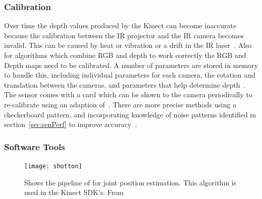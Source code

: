 \documentclass[11pt]{article} %
\begin{document}
\subsubsection{Calibration}


Over time the depth values produced by the Kinect can become inaccurate because the calibration between the IR projector and the IR camera becomes invalid. This can be caused by heat or vibration or a drift in the IR laser~\cite{Zhang2012a}. Also for algorithms which combine RGB and depth to work correctly the RGB and Depth maps need to be calibrated. A number of parameters are stored in memory to handle this, including individual parameters for each camera, the rotation and translation between the cameras, and parameters that help determine depth~\cite{Zhang2011c}. The sensor comes with a card which can be shown to the camera periodically to re-calibrate using an adaption of~\cite{Zhang2000a}. There are more precise methods using a checkerboard pattern, and incorporating knowledge of noise patterns identified in section~\ref{sec:senPerf} to improve accuracy~\cite{Zhang2011c,Smisek2011,DanielHerrera2012a}.




\subsubsection{Software Tools}
\label{sec:sofTools}
\begin{figure}
\centering
\texttt{[image: shotton]}
\caption{ Shows the pipeline of \cite{Blake2011} for joint position estimation. This algorithm is used in the Kinect SDK's. From \cite{Blake2011}		\label{fig:shotton}  } 
\end{figure}
\end{document}
